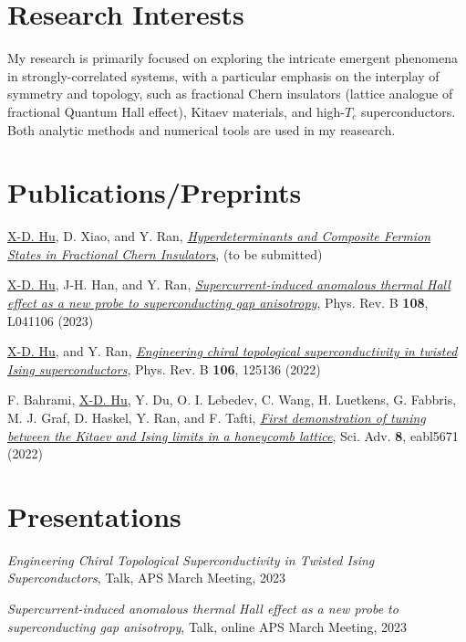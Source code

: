\documentclass{article}
\renewenvironment{itemize}{
  \begin{list}{}{
    \setlength{\leftmargin}{1.5em}
  }
}{
  \end{list}
}
\begin{document}
\section*{Research Interests}
My research is primarily focused on exploring the intricate emergent phenomena in strongly-correlated systems, with a particular emphasis on the interplay of symmetry and topology, such as fractional Chern insulators (lattice analogue of fractional Quantum Hall effect), Kitaev materials, and high-$T_c$ superconductors. Both analytic methods and numerical tools are used in my reasearch.

\section*{Publications/Preprints}
\begin{itemize}
    \item \underline{X-D. Hu}, D. Xiao, and Y. Ran, \href{???}{\emph{Hyperdeterminants and Composite Fermion States in Fractional Chern Insulators}},  (to be submitted)
    \item \underline{X-D. Hu}, J-H. Han, and Y. Ran, \href{https://journals.aps.org/prb/abstract/10.1103/PhysRevB.108.L041106}{\emph{Supercurrent-induced anomalous thermal Hall effect as a new probe to superconducting gap anisotropy}}, Phys. Rev. B {\bf 108}, L041106 (2023)
    \item \underline{X-D. Hu}, and Y. Ran, \href{https://journals.aps.org/prb/abstract/10.1103/PhysRevB.106.125136}{\emph{Engineering chiral topological superconductivity in twisted Ising superconductors}}, Phys. Rev. B {\bf 106}, 125136 (2022)
    \item F. Bahrami, \underline{X-D. Hu}, Y. Du, O. I. Lebedev, C. Wang, H. Luetkens, G. Fabbris, M. J. Graf, D. Haskel, Y. Ran, and F. Tafti, \href{https://www.science.org/doi/full/10.1126/sciadv.abl5671}{\emph{First demonstration of tuning between the Kitaev and Ising limits in a honeycomb lattice}}, Sci. Adv. {\bf 8}, eabl5671 (2022)
\end{itemize}


\section*{Presentations}
\begin{itemize}
    \item \emph{Engineering Chiral Topological Superconductivity in Twisted Ising Superconductors}, Talk, APS March Meeting, 2023
    \item \emph{Supercurrent-induced anomalous thermal Hall effect as a new probe to superconducting gap anisotropy}, Talk, online APS March Meeting, 2023
\end{itemize}
\end{document}
